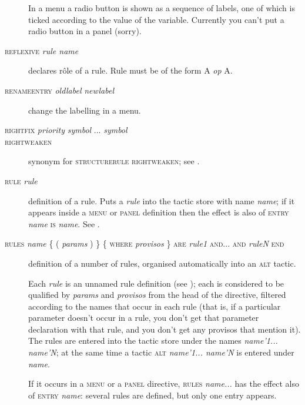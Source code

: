 \begin{description}
In a menu a radio button is shown as a sequence of labels, one of which is ticked according to the value of the variable. Currently you can't put a radio button in a panel (sorry).%

\item[\textsc{reflexive} \textit{rule name}] declares r\^ole of a rule. Rule must be of the form A \textit{op} A.

\item[\textsc{renameentry} \textit{oldlabel} \textit{newlabel}] change the labelling in a menu.

\item[\textsc{rightfix} \textit{priority} \textit{symbol} ... \textit{symbol}]
\item[\textsc{rightweaken}] synonym for \textsc{structurerule} \textsc{rightweaken}; see .

\item[\textsc{rule} \textit{rule}] definition of a rule. Puts a \textit{rule} into the tactic store with name \textit{name}; if it appears inside a \textsc{menu} or \textsc{panel} definition then the effect is also of \textsc{entry} \textit{name} \textsc{is} \textit{name}. See .

\item[\textsc{rules} \textit{name} \{ ( \textit{params} ) \} \{ \textsc{where} \textit{provisos} \} \textsc{are} \textit{rule1} \textsc{and... and} \textit{ruleN} \textsc{end}] definition of a number of rules, organised automatically into an \textsc{alt} tactic.

Each \textit{rule} is an unnamed rule definition (see ); each is considered to be qualified by \textit{params} and \textit{provisos} from the head of the directive, filtered according to the names that occur in each rule (that is, if a particular parameter doesn't occur in a rule, you don't get that parameter declaration with that rule, and you don't get any provisos that mention it). The rules are entered into the tactic store under the names \textit{name'1... name'N}; at the same time a tactic \textsc{alt} \textit{name'1... name'N} is entered under \textit{name}.

If it occurs in a \textsc{menu} or a \textsc{panel} directive, \textsc{rules} \textit{name...} has the effect also of \textsc{entry} \textit{name}: several rules are defined, but only one entry appears.


\end{description}
